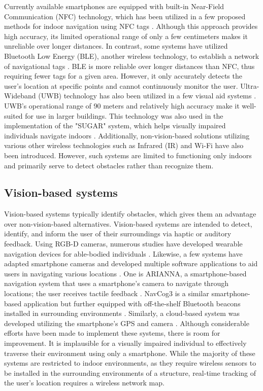 \documentclass[journal,12pt,onecolumn,letterpaper]{IEEEtran}
\begin{document}
Currently available smartphones are equipped with built-in Near-Field Communication (NFC) technology, which has been utilized in a few proposed methods for indoor navigation using NFC tags \cite{garrido_support_2012}. Although this approach provides high accuracy, its limited operational range of only a few centimeters makes it unreliable over longer distances. In contrast, some systems have utilized Bluetooth Low Energy (BLE), another wireless technology, to establish a network of navigational tags \cite{nagarajan_localization_2020}. BLE is more reliable over longer distances than NFC, thus requiring fewer tags for a given area. However, it only accurately detects the user's location at specific points and cannot continuously monitor the user. Ultra-Wideband (UWB) technology has also been utilized in a few visual aid systems \cite{alnafessah_developing_2016}. UWB's operational range of 90 meters and relatively high accuracy make it well-suited for use in larger buildings. This technology was also used in the implementation of the "SUGAR" system, which helps visually impaired individuals navigate indoors \cite{martinez-sala_design_2015}. Additionally, non-vision-based solutions utilizing various other wireless technologies such as Infrared (IR) \cite{bendanillo_sight-man_2020} and Wi-Fi have also been introduced. However, such systems are limited to functioning only indoors and primarily serve to detect obstacles rather than recognize them.

\subsection{Vision-based systems}

Vision-based systems typically identify obstacles, which gives them an advantage over non-vision-based alternatives. Vision-based systems are intended to detect, identify, and inform the user of their surroundings via haptic or auditory feedback. Using RGB-D cameras, numerous studies have developed wearable navigation devices for able-bodied individuals \cite{kayukawa_blindpilot_2020, zhang_slam_2015}. Likewise, a few systems have adapted smartphone cameras and developed multiple software applications to aid users in navigating various locations \cite{khan_insight_2021}. One is ARIANNA, a smartphone-based navigation system that uses a smartphone's camera to navigate through locations; the user receives tactile feedback \cite{croce_arianna_2014,croce_enhancing_2016}. NavCog3 is a similar smartphone-based application but further equipped with off-the-shelf Bluetooth beacons installed in surrounding environments \cite{sato_navcog3_2019}. Similarly, a cloud-based system was developed utilizing the smartphone’s GPS and camera \cite{lapyko_cloud-based_2014}. Although considerable efforts have been made to implement these systems, there is room for improvement. It is implausible for a visually impaired individual to effectively traverse their environment using only a smartphone. While the majority of these systems are restricted to indoor environments, as they require wireless sensors to be installed in the surrounding environments of a structure, real-time tracking of the user's location requires a wireless network map.
\end{document}
